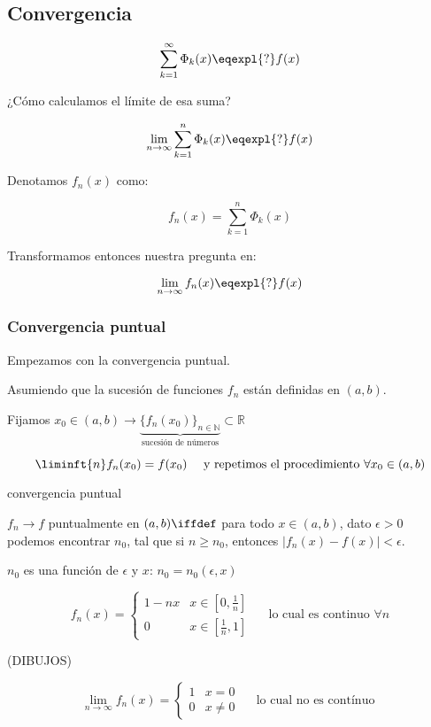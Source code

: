 	\subsection{Convergencia}

	\[ \sum^{\infty}_{k=1} \Phi_k(x) \eqexpl{?} f(x) \]

	¿Cómo calculamos el límite de esa suma?

	\[ \lim_{n \rightarrow \infty} \sum^{n}_{k=1} \Phi_k(x) \eqexpl{?} f(x) \]

	Denotamos $f_n(x)$ como:

	\[
	f_n(x) = \sum^{n}_{k=1} \Phi_k(x)
	\]

	Transformamos entonces nuestra pregunta en:

	\[ \lim_{n \rightarrow \infty} f_n(x) \eqexpl{?} f(x) \]

	\subsubsection{Convergencia puntual}

		Empezamos con la convergencia puntual.

		Asumiendo que la sucesión de funciones $f_n$ están definidas en $(a,b)$.

		Fijamos $x_0 \in (a,b) \rightarrow \underbrace{ \{f_n(x_0)\}_{n \in \mathbb{N} }}_{\text{sucesión de números}} \subset \mathbb{R} $

		\[ \liminft{n} f_n(x_0) = f(x_0) \quad \text{ y repetimos el procedimiento }\forall x_0 \in (a,b)\]

		\begin{defn}{convergencia puntual}

			$ f_n \rightarrow f $ puntualmente  en $(a,b) \iffdef $ para todo $x \in (a,b)$, dato $\epsilon > 0$ podemos encontrar $n_0$, tal que si $n \geq n_0$, entonces $|f_n(x) - f(x)| < \epsilon$.

			\begin{obs}
				$n_0$ es una función de $\epsilon$ y $x$: $n_0 = n_0(\epsilon, x)$
			\end{obs}

		\end{defn}

		\begin{example}{1}

			\[
			f_n(x) = \begin{cases}
			1 - nx & x \in [0, \frac{1}{n}]\\
			0 & x \in [\frac{1}{n},1]
			\end{cases} \quad \text{ lo cual es continuo }\forall n
			\]

			(DIBUJOS)


			\[
			\lim_{n \rightarrow \infty} f_n(x) = \begin{cases}
			1 & x = 0\\
			0 & x \neq 0
			\end{cases} \quad \text{ lo cual no es contínuo }
			\]

		\end{example}

